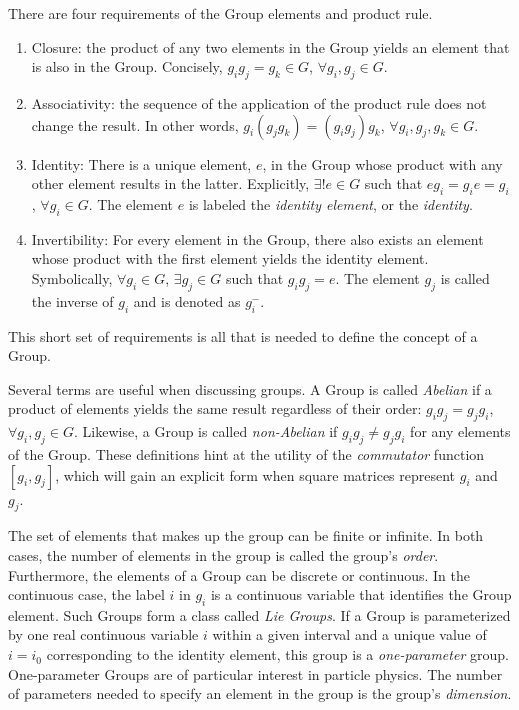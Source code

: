 There are four requirements of the Group elements and product rule.
\begin{enumerate}
    \item Closure: the product of any two elements in the Group yields an element that is also in the Group. Concisely, $g_ig_j=g_k\in G$, $\forall g_i,g_j\in G$.
    \item Associativity: the sequence of the application of the product rule does not change the result. In other words, $g_i(g_jg_k)=(g_ig_j)g_k$, $\forall g_i,g_j,g_k\in G$.
    \item Identity: There is a unique element, $e$, in the Group whose product with any other element results in the latter. Explicitly, $\exists!e\in G$ such that $eg_i=g_ie=g_i$, $\forall g_i\in G$. The element $e$ is labeled the \emph{identity element}, or the \emph{identity}.
    \item Invertibility: For every element in the Group, there also exists an element whose product with the first element yields the identity element. Symbolically, $\forall g_i\in G$, $\exists g_j\in G$ such that $g_ig_j=e$. The element $g_j$ is called the inverse of $g_i$ and is denoted as $g_i^{-}$.
\end{enumerate}
This short set of requirements is all that is needed to define the concept of a Group.

Several terms are useful when discussing groups.
A Group is called \emph{Abelian} if a product of elements yields the same result regardless of their order: $g_ig_j=g_jg_i$, $\forall g_i,g_j\in G$.
Likewise, a Group is called \emph{non-Abelian} if $g_ig_j\ne g_jg_i$ for any elements of the Group.
These definitions hint at the utility of the \emph{commutator} function $[g_i,g_j]$, which will gain an explicit form when square matrices represent $ g_i$ and $g_j$.

The set of elements that makes up the group can be finite or infinite.
In both cases, the number of elements in the group is called the group's \emph{order}.
Furthermore, the elements of a Group can be discrete or continuous.
In the continuous case, the label $i$ in $g_i$ is a continuous variable that identifies the Group element.
Such Groups form a class called \emph{Lie Groups}.
If a Group is parameterized by one real continuous variable $i$ within a given interval and a unique value of $i=i_0$ corresponding to the identity element, this group is a \emph{one-parameter} group. 
One-parameter Groups are of particular interest in particle physics.
The number of parameters needed to specify an element in the group is the group's \emph{dimension}.

